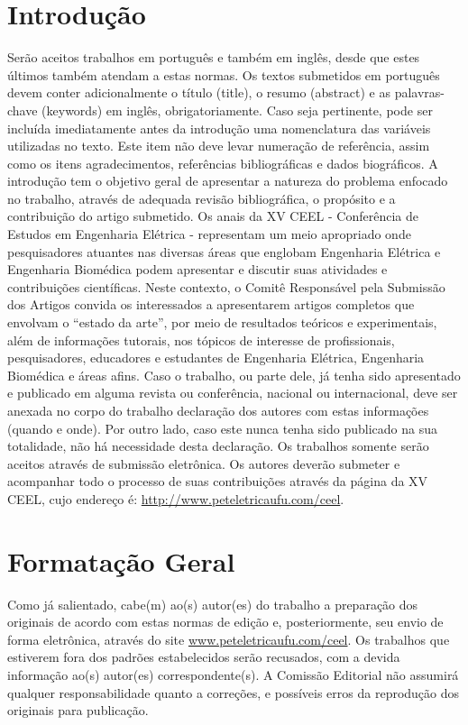 \documentclass{ceel}
\begin{document}
\begin{multicols}{2}
\section{Introdução}
Serão aceitos trabalhos em português e também em inglês, desde que estes últimos também atendam a estas normas. Os textos submetidos em português devem conter adicionalmente o título (title), o resumo (abstract) e as palavras-chave (keywords) em inglês, obrigatoriamente.
Caso seja pertinente, pode ser incluída imediatamente antes da introdução uma nomenclatura das variáveis utilizadas no texto. Este item não deve levar numeração de referência, assim como os itens agradecimentos, referências bibliográficas e dados biográficos.
A introdução tem o objetivo geral de apresentar a natureza do problema enfocado no trabalho, através de adequada revisão bibliográfica, o propósito e a contribuição do artigo submetido.
Os anais da XV CEEL - Conferência de Estudos em Engenharia Elétrica - representam um meio apropriado onde pesquisadores atuantes nas diversas áreas que englobam Engenharia Elétrica e Engenharia Biomédica podem apresentar e discutir suas atividades e contribuições científicas. Neste contexto, o Comitê Responsável pela Submissão dos Artigos convida os interessados a apresentarem artigos completos que envolvam o “estado da arte”, por meio de resultados teóricos e experimentais, além de informações tutorais, nos tópicos de interesse de profissionais, pesquisadores, educadores e estudantes de Engenharia Elétrica, Engenharia Biomédica e áreas afins. 
Caso o trabalho, ou parte dele, já tenha sido apresentado e publicado em alguma revista ou conferência, nacional ou internacional, deve ser anexada no corpo do trabalho declaração dos autores com estas informações (quando e onde). Por outro lado, caso este nunca tenha sido publicado na sua totalidade, não há necessidade desta declaração.
Os trabalhos somente serão aceitos através de submissão eletrônica. Os autores deverão submeter e acompanhar todo o processo de suas contribuições através da página da XV CEEL, cujo endereço é: \url{http://www.peteletricaufu.com/ceel}.

\section{Formatação Geral}
Como já salientado, cabe(m) ao(s) autor(es) do trabalho a preparação dos originais de acordo com estas normas de edição e, posteriormente, seu envio de forma eletrônica, através do site \url{www.peteletricaufu.com/ceel}. Os trabalhos que estiverem fora dos padrões estabelecidos serão recusados, com a devida informação ao(s) autor(es) correspondente(s).
A Comissão Editorial não assumirá qualquer responsabilidade quanto a correções, e possíveis erros da reprodução dos originais para publicação.


\end{multicols}
\end{document}
